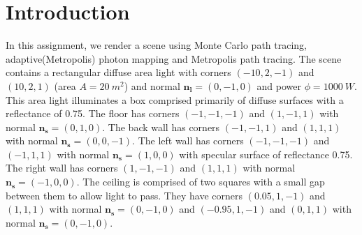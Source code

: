 \section*{Introduction}
In this assignment, we render a scene using Monte Carlo path tracing, adaptive(Metropolis) photon mapping and Metropolis path tracing. The scene contains a rectangular diffuse area light with corners $(-10,2,-1)$ and $(10,2,1)$ (area $A=20\ m^2$) and normal $\mathbf{n_l}=(0,-1,0)$ and power $\phi=1000\ W$. This area light illuminates a box comprised primarily of diffuse surfaces with a reflectance of 0.75. The floor has corners $(-1,-1,-1)$ and $(1,-1,1)$ with normal $\mathbf{n_s}=(0,1,0)$. The back wall has corners $(-1,-1,1)$ and $(1,1,1)$ with normal $\mathbf{n_s}=(0,0,-1)$. The left wall has corners $(-1,-1,-1)$ and $(-1,1,1)$ with normal $\mathbf{n_s}=(1,0,0)$ with specular surface of reflectance 0.75. The right wall has corners $(1,-1,-1)$ and $(1,1,1)$ with normal $\mathbf{n_s}=(-1,0,0)$. The ceiling is comprised of two squares with a small gap between them to allow light to pass. They have corners $(0.05,1,-1)$ and $(1,1,1)$ with normal $\mathbf{n_s}=(0,-1,0)$ and $(-0.95,1,-1)$ and $(0,1,1)$ with normal $\mathbf{n_s}=(0,-1,0)$. 
